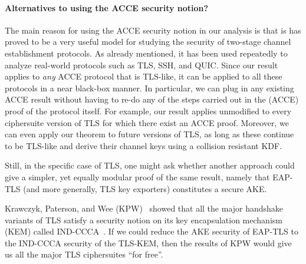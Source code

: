 



\paragraph{Alternatives to using the ACCE security notion?}
The main reason for using the ACCE security notion in our analysis is that is has proved to be a very useful model for studying the security of two-stage channel establishment protocols. 
As already mentioned,
 it has been used repeatedly to analyze real-world protocols such as TLS, SSH, and QUIC. 
Since our result applies to \emph{any} ACCE protocol that is TLS-like,
it can be applied to all these protocols in a near black-box manner.
In particular, 
we can plug in any existing ACCE result without having to re-do any of the steps carried out in the (ACCE) proof of the protocol itself. 
For example, our result applies unmodified to every ciphersuite version of TLS for which there exist an ACCE proof.
Moreover, we can even apply our theorem to future versions of TLS, 
as long as these continue to be TLS-like and derive their channel keys using a collision resistant KDF.

Still, in the specific case of TLS, one might ask whether another approach could give a simpler,
yet equally modular proof of the same result,
namely that EAP-TLS (and more generally, TLS key exporters) constitutes a secure AKE.

Krawczyk, Paterson, and Wee (KPW)~\cite{C:KraPatWee13} showed that all the major handshake variants of TLS satisfy a security notion on its key encapsulation mechanism (KEM) called IND-CCCA~\cite{C:HofKil07}. 
If we could reduce the AKE security of EAP-TLS to the IND-CCCA security of the TLS-KEM,
then the results of KPW would give us all the major TLS ciphersuites ``for free''.

